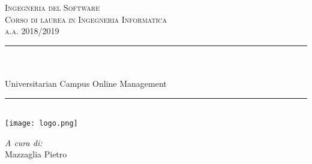 \begin{titlepage}
	\centering
	\vspace*{0.5 cm}
	\begin{center}    \textsc{
			\Large   
			Ingegneria del Software \\
			Corso di laurea in Ingegneria Informatica \\[0.3 cm]
			a.a. 2018/2019}\\[2.0 cm]	\end{center}
		
		
	\rule{\linewidth}{0.2 mm} \\[0.4 cm]
	{ 	\huge \textbf{\thetitle} \\
		\large Universitarian Campus Online Management}\\
	\rule{\linewidth}{0.2 mm}\\[1 cm] 
	
	\texttt{[image: logo.png]}
	\\[3 cm]
	
	\begin{minipage}{0.4\textwidth}
		\begin{flushleft} \large
		\end{flushleft}
	\end{minipage}
	\begin{minipage}{0.4\textwidth}
		
	\begin{flushright} \large
			\emph{A cura di:} \\
			Mazzaglia Pietro 
	\end{flushright}
		
	\end{minipage}
	
\end{titlepage}